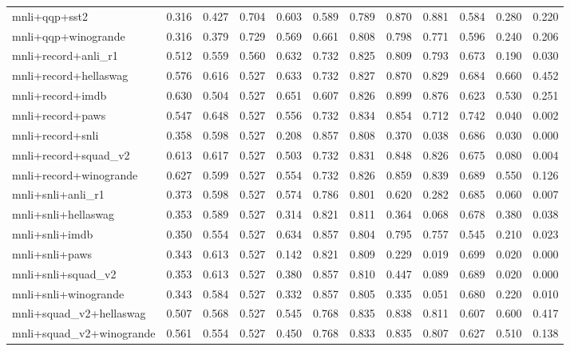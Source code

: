 \begin{table}[t]
\begin{tabular}{lrrrrrrrrrrr}
    mnli+qqp+sst2 & 0.316 & 0.427 & 0.704 & 0.603 & 0.589 & 0.789 & 0.870 & 0.881 & 0.584 & 0.280 & 0.220 \\
    mnli+qqp+winogrande & 0.316 & 0.379 & 0.729 & 0.569 & 0.661 & 0.808 & 0.798 & 0.771 & 0.596 & 0.240 & 0.206 \\
    mnli+record+anli\_r1 & 0.512 & 0.559 & 0.560 & 0.632 & 0.732 & 0.825 & 0.809 & 0.793 & 0.673 & 0.190 & 0.030 \\
    mnli+record+hellaswag & 0.576 & 0.616 & 0.527 & 0.633 & 0.732 & 0.827 & 0.870 & 0.829 & 0.684 & 0.660 & 0.452 \\
    mnli+record+imdb & 0.630 & 0.504 & 0.527 & 0.651 & 0.607 & 0.826 & 0.899 & 0.876 & 0.623 & 0.530 & 0.251 \\
    mnli+record+paws & 0.547 & 0.648 & 0.527 & 0.556 & 0.732 & 0.834 & 0.854 & 0.712 & 0.742 & 0.040 & 0.002 \\
    mnli+record+snli & 0.358 & 0.598 & 0.527 & 0.208 & 0.857 & 0.808 & 0.370 & 0.038 & 0.686 & 0.030 & 0.000 \\
    mnli+record+squad\_v2 & 0.613 & 0.617 & 0.527 & 0.503 & 0.732 & 0.831 & 0.848 & 0.826 & 0.675 & 0.080 & 0.004 \\
    mnli+record+winogrande & 0.627 & 0.599 & 0.527 & 0.554 & 0.732 & 0.826 & 0.859 & 0.839 & 0.689 & 0.550 & 0.126 \\
    mnli+snli+anli\_r1 & 0.373 & 0.598 & 0.527 & 0.574 & 0.786 & 0.801 & 0.620 & 0.282 & 0.685 & 0.060 & 0.007 \\
    mnli+snli+hellaswag & 0.353 & 0.589 & 0.527 & 0.314 & 0.821 & 0.811 & 0.364 & 0.068 & 0.678 & 0.380 & 0.038 \\
    mnli+snli+imdb & 0.350 & 0.554 & 0.527 & 0.634 & 0.857 & 0.804 & 0.795 & 0.757 & 0.545 & 0.210 & 0.023 \\
    mnli+snli+paws & 0.343 & 0.613 & 0.527 & 0.142 & 0.821 & 0.809 & 0.229 & 0.019 & 0.699 & 0.020 & 0.000 \\
    mnli+snli+squad\_v2 & 0.353 & 0.613 & 0.527 & 0.380 & 0.857 & 0.810 & 0.447 & 0.089 & 0.689 & 0.020 & 0.000 \\
    mnli+snli+winogrande & 0.343 & 0.584 & 0.527 & 0.332 & 0.857 & 0.805 & 0.335 & 0.051 & 0.680 & 0.220 & 0.010 \\
    mnli+squad\_v2+hellaswag & 0.507 & 0.568 & 0.527 & 0.545 & 0.768 & 0.835 & 0.838 & 0.811 & 0.607 & 0.600 & 0.417 \\
    mnli+squad\_v2+winogrande & 0.561 & 0.554 & 0.527 & 0.450 & 0.768 & 0.833 & 0.835 & 0.807 & 0.627 & 0.510 & 0.138 \\

\end{tabular}
\end{table}
